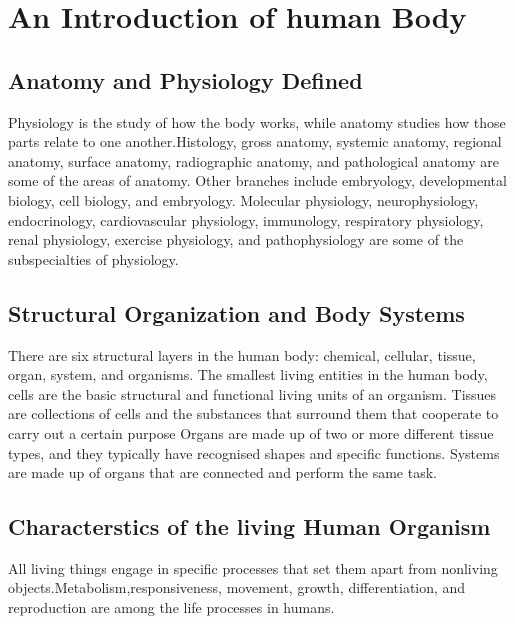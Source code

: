 \documentclass[12pt]{article}
\begin{document}
\tableofcontents
\clearpage
\section{An Introduction of human Body}
\subsection{Anatomy and Physiology Defined}
Physiology is the study of how the body works, while anatomy studies how those parts relate to one another.Histology, gross anatomy, systemic anatomy, regional anatomy, surface anatomy, radiographic anatomy, and pathological anatomy are some of the areas of anatomy. Other branches include embryology, developmental biology, cell biology, and embryology.
Molecular physiology, neurophysiology, endocrinology, cardiovascular physiology, immunology, respiratory physiology, renal physiology, exercise physiology, and pathophysiology are some of the subspecialties of physiology.
\subsection{Structural Organization and Body Systems}
There are six structural layers in the human body: chemical, cellular, tissue, organ, system, and organisms. 
The smallest living entities in the human body, cells are the basic structural and functional living units of an organism. 
Tissues are collections of cells and the substances that surround them that cooperate to carry out a certain purpose Organs are made up of two or more different tissue types, and they typically have recognised shapes and specific functions.  Systems are made up of organs that are connected and perform the same task.
\subsection{Characterstics of the living Human Organism}
All living things engage in specific processes that set them apart from nonliving objects.Metabolism,responsiveness, movement, growth, differentiation, and reproduction are among the life processes in humans.
\end{document}
